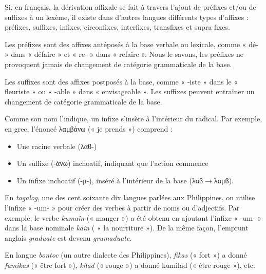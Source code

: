 Si, en français, la dérivation affixale se fait à travers l’ajout de préfixes et/ou de suffixes à un lexème, il existe dans d’autres langues différents types d’affixes : préfixes, suffixes, infixes, circonfixes, interfixes, transfixes et supra fixes.

Les préfixes sont des affixes antéposés à la base verbale ou lexicale, comme « dé- » dans « défaire » et « re- » dans « refaire ». Nous le savons, les préfixes ne provoquent jamais de changement de catégorie grammaticale de la base.

Les suffixes sont des affixes postposés à la base, comme « -iste » dans le « fleuriste » ou « -able » dans « envisageable ». Les suffixes peuvent entraîner un changement de catégorie grammaticale de la base.

Comme son nom l’indique, un infixe s’insère à l’intérieur du radical. Par exemple, en grec, l’énoncé {\BBSixGreek λαμβάνω} (« je prends ») comprend :
\begin{itemize}
\item Une racine verbale ({\BBSixGreek λαϐ-})
\item Un suffixe ({\BBSixGreek -άνω}) inchoatif, indiquant que l’action commence
\item Un infixe inchoatif (-{\BBSixGreek μ}-), inséré à l’intérieur de la base ({\BBSixGreek λαϐ}$\rightarrow${\BBSixGreek λαμϐ}).
\end{itemize}
En \textit{tagalog}, une des cent soixante dix langues parlées aux Philippines, on utilise l’infixe « -um- » pour créer des verbes à partir de noms ou d’adjectifs. Par exemple, le verbe \textit{kumain} (« manger ») a été obtenu en ajoutant l’infixe « -um- » dans la base nominale \textit{kain} ( « la nourriture »). De la même façon, l’emprunt anglais \textit{graduate} est devenu \textit{grumaduate}.

En langue \textit{bontoc} (un autre dialecte des Philippines), \textit{fikas} (« fort ») a donné \textit{fumikas} (« être fort »), \textit{kilad} (« rouge ») a donné kumilad (« être rouge »), etc.

